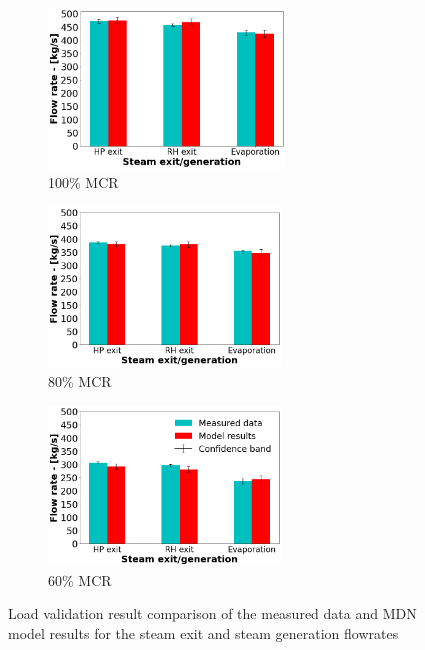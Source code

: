\documentclass[a4paper,fleqn]{cas-sc}
\begin{document}
\begin{figure}[h!]
\centering
\begin{subfigure}{0.33\textwidth}
\includegraphics[width=\linewidth, height = 4.25cm]{100_CASE_STEAM}
        \caption{100\% MCR}
\end{subfigure}\hfill %
\begin{subfigure}{0.33\textwidth}
    \includegraphics[width=\linewidth, height = 4.25cm]{80_CASE_STEAM}
    \caption{80\% MCR}
\end{subfigure}\hfill
\begin{subfigure}{0.33\textwidth}
	\includegraphics[width=\linewidth, height = 4.25cm]{60_CASE_STEAM}
    \caption{60\% MCR}
\end{subfigure}
\caption{Load validation result comparison of the measured data and MDN model results for the steam exit and  steam generation flowrates}
\label{fig_steam_gen}
\end{figure}
\end{document}
